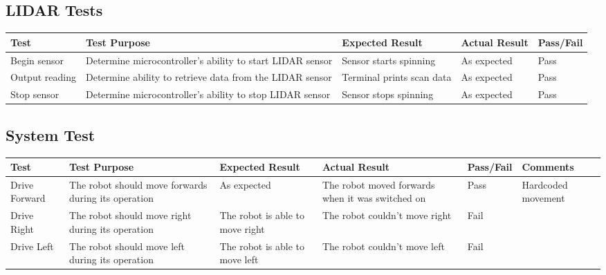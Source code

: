 \begin{landscape}
				\subsection{LIDAR Tests}
				\begin{table}[h!]
					\centering
					\label{table:lidartestbasic}
					\begin{tabular}{| p{2.5cm} | p{5cm} | p{4cm} | p{3cm} | p{1.5cm} |} 
						\hline
						Test & Test Purpose & Expected Result & Actual Result & Pass/Fail \\ [0.5ex] 
						\hline
						Begin sensor & Determine microcontroller's ability to start LIDAR sensor & Sensor starts spinning & As expected & Pass  \\
						
						Output reading & Determine ability to retrieve data from the LIDAR sensor & Terminal prints scan data & As expected & Pass \\
						 
						Stop sensor & Determine microcontroller's ability to stop LIDAR sensor & Sensor stops spinning & As expected & Pass   \\ [1ex] 
						\hline
					\end{tabular}		
				\end{table}
			
				\subsection{System Test}
				\begin{table}[h!]
					\centering
					\label{systemintergrationtestingtable}
					\begin{tabular}{| p{2.5cm} | p{5cm} | p{4cm} | p{4cm} | p{1.5cm} | p{2cm} |} 
						\hline
						Test & Test Purpose & Expected Result & Actual Result & Pass/Fail & Comments \\ [0.5ex] 
						\hline
						Drive Forward & The robot should move forwards during its operation & As expected & The robot moved forwards when it was switched on & Pass & Hardcoded movement  \\
						
						Drive Right & The robot should move right during its operation & The robot is able to move right & The robot couldn't move right & Fail &   \\
						
						Drive Left & The robot should move left during its operation & The robot is able to move left & The robot couldn't move left & Fail &   \\
						

\end{tabular}
\end{table}
\end{landscape}
